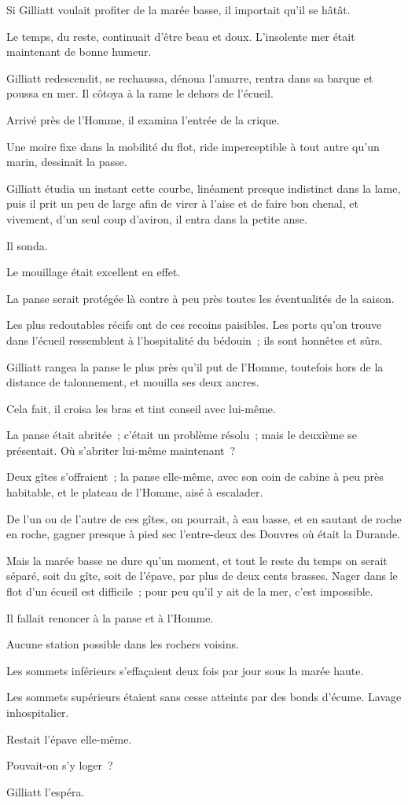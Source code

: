 \documentclass[french,twoside]{book} %
\begin{document}
Si Gilliatt voulait profiter de la marée basse, il importait qu’il se hâtât.\par
Le temps, du reste, continuait d’être beau et doux.  L’insolente mer était maintenant de bonne humeur.\par
Gilliatt redescendit, se rechaussa, dénoua l’amarre, rentra dans sa barque et poussa en mer. Il côtoya à la rame le dehors de l’écueil.\par
Arrivé près de l’Homme, il examina l’entrée de la crique.\par
Une moire fixe dans la mobilité du flot, ride imperceptible à tout autre qu’un marin, dessinait la passe.\par
Gilliatt étudia un instant cette courbe, linéament presque indistinct dans la lame, puis il prit un peu de large afin de virer à l’aise et de faire bon chenal, et vivement, d’un seul coup d’aviron, il entra dans la petite anse.\par
Il sonda.\par
Le mouillage était excellent en effet.\par
La panse serait protégée là contre à peu près toutes les éventualités de la saison.\par
Les plus redoutables récifs ont de ces recoins paisibles. Les ports qu’on trouve dans l’écueil ressemblent à l’hospitalité du bédouin ; ils sont honnêtes et sûrs.\par
Gilliatt rangea la panse le plus près qu’il put de l’Homme, toutefois hors de la distance de talonnement, et mouilla ses deux ancres.\par
Cela fait, il croisa les bras et tint conseil avec lui-même.\par
La panse était abritée ; c’était un problème résolu ; mais le deuxième se présentait. Où s’abriter lui-même maintenant ?\par
Deux gîtes s’offraient ; la panse elle-même, avec  son coin de cabine à peu près habitable, et le plateau de l’Homme, aisé à escalader.\par
De l’un ou de l’autre de ces gîtes, on pourrait, à eau basse, et en sautant de roche en roche, gagner presque à pied sec l’entre-deux des Douvres où était la Durande.\par
Mais la marée basse ne dure qu’un moment, et tout le reste du temps on serait séparé, soit du gîte, soit de l’épave, par plus de deux cents brasses. Nager dans le flot d’un écueil est difficile ; pour peu qu’il y ait de la mer, c’est impossible.\par
Il fallait renoncer à la panse et à l’Homme.\par
Aucune station possible dans les rochers voisins.\par
Les sommets inférieurs s’effaçaient deux fois par jour sous la marée haute.\par
Les sommets supérieurs étaient sans cesse atteints par des bonds d’écume. Lavage inhospitalier.\par
Restait l’épave elle-même.\par
Pouvait-on s’y loger ?\par
Gilliatt l’espéra.
\end{document}
